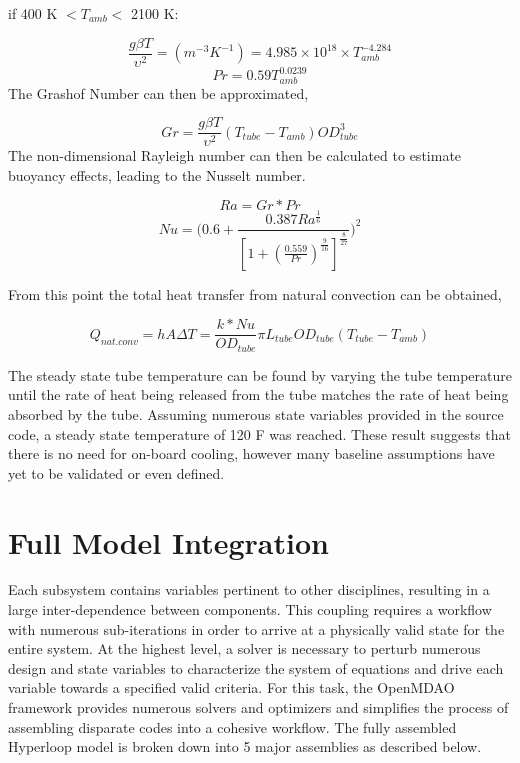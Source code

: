 \documentclass[heading.tex]{subfiles}
\begin{document}
if 400 K $<  T_{amb}  <$ 2100 K:


\begin{equation*}
\frac{g \beta T} {\upsilon^2}  = (m^{-3}K^{-1}) = 4.985\times10^{18} \times T_{amb}^{-4.284}
\end{equation*}
\begin{equation*}
Pr = 0.59 T_{amb}^{0.0239}
\end{equation*}
The Grashof Number can then be approximated,


\begin{equation*}
Gr = \frac{g \beta T} {\upsilon^2}  (T_{tube}-T_{amb}) {OD}_{tube}^3
\end{equation*}
The non-dimensional Rayleigh number can then be calculated to estimate buoyancy effects, leading to the Nusselt number.


\begin{equation*}
Ra = Gr * Pr
\end{equation*}
\begin{equation*}
Nu = \Bigg(0.6 + \frac{0.387Ra^{\frac{1}{6}}}{[1+(\frac{0.559}{Pr})^{\frac{9}{16}}]^{\frac{8}{27}}}\Bigg)^2
\end{equation*}

From this point the total heat transfer from natural convection can be obtained,

\begin{equation*}
Q_{nat. conv} = hA \Delta T = \frac{k*Nu}{ {OD}_{tube}} \pi {L}_{tube} {OD}_{tube} (T_{tube}-T_{amb})
\end{equation*}

The steady state tube temperature can be found by varying the tube temperature until the rate of heat being released from the tube
matches the rate of heat being absorbed by the tube. Assuming numerous state variables provided in the source code, a steady state temperature of 120 F
was reached. These result suggests that there is no need for on-board cooling, however many baseline assumptions have yet to be validated or even defined.

\section{Full Model Integration}

Each subsystem contains variables pertinent to other disciplines, resulting in a large inter-dependence between components. 
This coupling requires a workflow with numerous sub-iterations in order to arrive at a physically valid state for the entire system.
At the highest level, a solver is necessary to perturb numerous design and state variables to characterize the system of equations and drive each variable
towards a specified valid criteria. For this task, the OpenMDAO framework provides numerous solvers and optimizers and simplifies the process of assembling
disparate codes into a cohesive workflow. The fully assembled Hyperloop model is broken down into 5 major assemblies as described below. 
\end{document}
